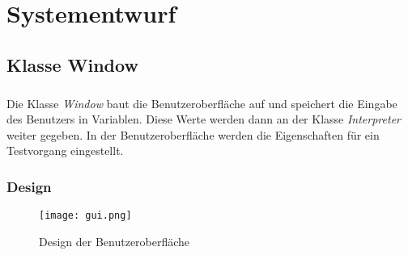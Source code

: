 \chapter{Systementwurf}\label{chp:systementwurf}

\section{Klasse Window}
\paragraph{}
Die Klasse \textit{Window} baut die Benutzeroberfläche auf und speichert die Eingabe des Benutzers in Variablen. Diese Werte werden dann an der Klasse \textit{Interpreter} weiter gegeben. In der Benutzeroberfläche werden die Eigenschaften für ein Testvorgang eingestellt.


\subsection{Design}
\begin{figure}[h]
  \begin{center}		%
    \texttt{[image: gui.png]}
  		  \caption{Design der Benutzeroberfläche}
     \label{fig.3pi-m3pi-Module}
  \end{center}
\end{figure}



